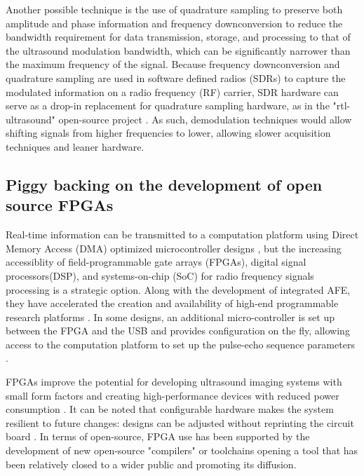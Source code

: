 \documentclass{article}
\begin{document}
Another possible technique \cite{peyton_comparison_2018} is the use of quadrature sampling to preserve both amplitude and phase information and frequency downconversion to reduce the bandwidth requirement for data transmission, storage, and processing to that of the ultrasound modulation bandwidth, which can be significantly narrower than the maximum frequency of the signal. Because frequency downconversion and quadrature sampling are used in software defined radios (SDRs) \cite{hager_design_2019, hager_lightprobe:_2019} to capture the modulated information on a radio frequency (RF) carrier, SDR hardware can serve as a drop-in replacement for quadrature sampling hardware, as in the "rtl-ultrasound" open-source project \cite{meng_rtl-ultrasound_2019}.  As such, demodulation techniques would allow shifting signals from higher frequencies to lower, allowing slower acquisition techniques and leaner hardware. 

\subsection{Piggy backing on the development of open source FPGAs}

Real-time information can be transmitted to a computation platform using Direct Memory Access (DMA) optimized microcontroller designs \cite{kidav_architecture_2019}, but the increasing accessiblity of field-programmable gate arrays (FPGAs), digital signal processors(DSP), and systems-on-chip (SoC) for radio frequency signals processing is a strategic option. Along with the development of integrated AFE, they have accelerated the creation and availability of high-end programmable research platforms  \cite{roman_open-source_2018}.  In some designs, an additional micro-controller is set up between the FPGA and the USB \cite{pashaei_live_2018, schneider_fully_2010} and provides configuration on the fly, allowing access to the computation platform to set up the pulse-echo sequence parameters \cite{raj_microcontroller_2017, raj_8051_2016}. 

FPGAs improve the potential for developing ultrasound imaging systems with small form factors and creating high-performance devices with reduced power consumption \cite{dusa_low_2014}. It can be noted that configurable hardware makes the system resilient to future changes: designs can be adjusted without reprinting the circuit board \cite{zhang_fpga_2012, qiu_programmable_2010, ibrahim_single-fpga_2017}. In terms of open-source, FPGA use has been supported by the development of new open-source "compilers" or toolchains \cite{shah_yosys+nextpnr:_2019} opening a tool that has been relatively closed to a wider public \cite{saiz-vela_low-cost_2020} and promoting its diffusion.
\end{document}
